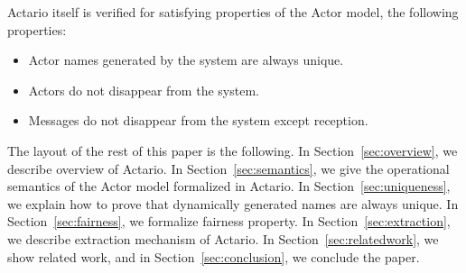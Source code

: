 Actario itself is verified for satisfying properties of the Actor model, the following properties:

\begin{itemize}
\item Actor names generated by the system are always unique.
\item Actors do not disappear from the system.
\item Messages do not disappear from the system except reception.
\end{itemize}





The layout of the rest of this paper is the following.
In Section~\ref{sec:overview}, we describe overview of Actario.
In Section~\ref{sec:semantics}, we give the operational semantics of the Actor model formalized in Actario.
In Section~\ref{sec:uniqueness}, we explain how to prove that dynamically generated names are always unique.
In Section~\ref{sec:fairness}, we formalize fairness property.
In Section~\ref{sec:extraction}, we describe extraction mechanism of Actario.
In Section~\ref{sec:relatedwork}, we show related work, and in Section~\ref{sec:conclusion}, we conclude the paper.

